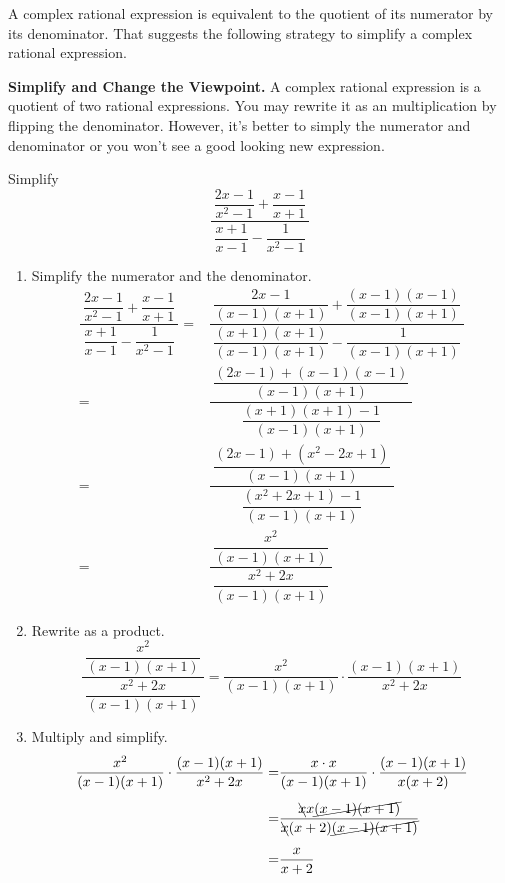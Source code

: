 \documentclass[
  en,11pt]{elegantbook}
\providecommand{\tightlist}{%
  \setlength{\itemsep}{0pt}\setlength{\parskip}{0pt}}
\newcommand{\size}[2]{{\fontsize{#1}{0}\selectfont#2}}
\renewenvironment{example}[1][]{
  \refstepcounter{exam}
  \par\noindent\textbf{\color{main}{\examplename} \theexam #1}
  \rmfamily
}{
  \par\ignorespacesafterend
}
\newenvironment{rmdtip}{
	\vspace*{0.5\baselineskip}
	\par\noindent
	\makebox[-3pt][r]{\color{red!90}\size{12}{\HandRight}\,\,}
    \begin{tcolorbox}[
    enhanced,
    title={\textbf{\color{second}Tips}},
    title style={left color=blue!10!green!20!white,right color=yellow!20!blue!20!white},
    colback=cyan!10!white,
    ]
    \sffamily
}{
    \end{tcolorbox}
    \par\ignorespacesafterend
}
\begin{document}
A complex rational expression is equivalent to the quotient of its numerator by its denominator. That suggests the following strategy to simplify a complex rational expression.

\begin{rmdtip}

\textbf{Simplify and Change the Viewpoint.} A complex rational expression is a quotient of two rational expressions. You may rewrite it as an multiplication by flipping the denominator. However, it's better to simply the numerator and denominator or you won't see a good looking new expression.

\end{rmdtip}

\begin{example}
Simplify
\[
\dfrac{~\dfrac{2x-1}{x^2-1}+\dfrac{x-1}{x+1}~}{~\dfrac{x+1}{x-1}-\dfrac{1}{x^2-1}~}
\]
\end{example}

\begin{solution}



\begin{enumerate}
\def\labelenumi{\arabic{enumi}.}
\tightlist
\item
  Simplify the numerator and the denominator.
  \[
       \begin{aligned}
           \dfrac{~\dfrac{2x-1}{x^2-1}+\dfrac{x-1}{x+1}~}{~\dfrac{x+1}{x-1}-\dfrac{1}{x^2-1}~}
           =&\dfrac{
               ~\dfrac{2x-1}{(x-1)(x+1)}+\dfrac{(x-1)(x-1)}{(x-1)(x+1)}~
           }{~
               \dfrac{(x+1)(x+1)}{(x-1)(x+1)}-\dfrac{1}{(x-1)(x+1)}~
           }\\[5pt]
           =&\dfrac{
               ~\dfrac{(2x-1)+(x-1)(x-1)}{(x-1)(x+1)}~
           }{
               ~\dfrac{(x+1)(x+1)-1}{(x-1)(x+1)}~
           }\\[5pt]
           =&\dfrac{
               ~\dfrac{(2x-1)+(x^2-2x+1)}{(x-1)(x+1)}~
           }{
               ~\dfrac{(x^2+2x+1)-1}{(x-1)(x+1)}~
           }\\[5pt]
           =&\dfrac{
               ~\dfrac{x^2}{(x-1)(x+1)}~
           }{
               ~\dfrac{x^2+2x}{(x-1)(x+1)}~
           }
       \end{aligned}
   \]
\item
  Rewrite as a product.
  \[
       \dfrac{
           ~\dfrac{x^2}{(x-1)(x+1)}~
       }{
           ~\dfrac{x^2+2x}{(x-1)(x+1)}~
       }
       =\dfrac{x^2}{(x-1)(x+1)}\cdot \dfrac{(x-1)(x+1)}{x^2+2x}
   \]
\item
  Multiply and simplify.
  \[
       \begin{aligned}
       \dfrac{x^2}{(x-1)(x+1)}\cdot \dfrac{(x-1)(x+1)}{x^2+2x}
       =&\dfrac{x\cdot x}{(x-1)(x+1)}\cdot \dfrac{(x-1)(x+1)}{x(x+2)}\\[5pt]
       =& \dfrac{\bcancel{x}x\cancel{(x-1)(x+1)}}{\bcancel{x}(x+2)\cancel{(x-1)(x+1)}}\\[5pt]
       =& \dfrac{x}{x+2}
       \end{aligned}
   \]
\end{enumerate}

\end{solution}
\end{document}
